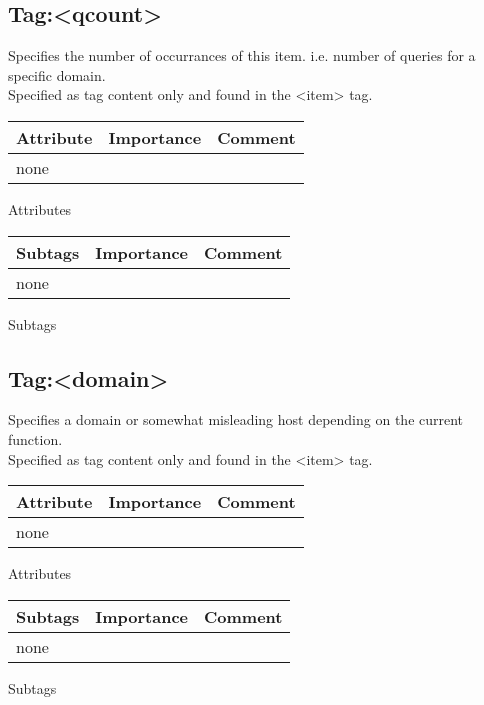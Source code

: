 \documentclass[a4paper]{article}
\newcommand{\xml}[1]{\textless#1\textgreater}
\begin{document}
    
    \subsection{Tag:\xml{qcount}  }
        Specifies the number of occurrances of this item. i.e. number of queries for a specific domain.\\ 
        Specified as tag content only and found in the \xml{item} tag.

    \begin{center}
        \begin{tabular}{ | p{2.1cm} | p{2cm} | p{9cm} |}
        \hline
        \textbf{Attribute} & \textbf{Importance} & \textbf{Comment}  
        \\ \hline
        none & &
        \\ \hline
        \end{tabular}
        
        \small Attributes
        
        \begin{tabular}{ | p{2.1cm} | p{2cm} | p{9cm} |}
        \hline
        \textbf{Subtags} & \textbf{Importance} & \textbf{Comment}  
        \\ \hline
        none
        &
        &
        \\ \hline
        \end{tabular}
        
        \small Subtags
    \end{center} 

    \subsection{Tag:\xml{domain}  }
        Specifies a domain or somewhat misleading host depending on the current function.\\ 
        Specified as tag content only and found in the \xml{item} tag.

    \begin{center}
        \begin{tabular}{ | p{2.1cm} | p{2cm} | p{9cm} |}
        \hline
        \textbf{Attribute} & \textbf{Importance} & \textbf{Comment}  
        \\ \hline
        none & &
        \\ \hline
        \end{tabular}
        
        \small Attributes
        
        \begin{tabular}{ | p{2.1cm} | p{2cm} | p{9cm} |}
        \hline
        \textbf{Subtags} & \textbf{Importance} & \textbf{Comment}  
        \\ \hline
        none
        &
        &
        \\ \hline
        \end{tabular}
        
        \small Subtags
    \end{center} 
  
\end{document}
